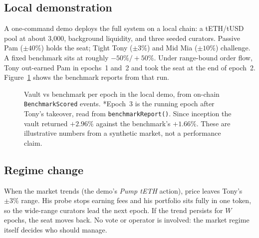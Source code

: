 \documentclass[11pt,a4paper]{article}
\newcommand{\code}[1]{\texttt{\small #1}}
\begin{document}
\subsection{Local demonstration}
A one-command demo deploys the full system on a local chain: a tETH/tUSD pool at about 3{,}000, background liquidity, and three seeded curators. Passive Pam ($\pm 40\%$) holds the seat; Tight Tony ($\pm 3\%$) and Mid Mia ($\pm 10\%$) challenge. A fixed benchmark sits at roughly $-50\%/+50\%$. Under range-bound order flow, Tony out-earned Pam in epochs~1 and~2 and took the seat at the end of epoch~2. Figure~\ref{fig:demo} shows the benchmark reports from that run.

\begin{figure}[h]
\centering
{}
\caption{Vault vs benchmark per epoch in the local demo, from on-chain \code{BenchmarkScored} events. *Epoch~3 is the running epoch after Tony's takeover, read from \code{benchmarkReport()}. Since inception the vault returned $+2.96\%$ against the benchmark's $+1.66\%$. These are illustrative numbers from a synthetic market, not a performance claim.}
\label{fig:demo}
\end{figure}

\subsection{Regime change}
When the market trends (the demo's \emph{Pump tETH} action), price leaves Tony's $\pm3\%$ range. His probe stops earning fees and his portfolio sits fully in one token, so the wide-range curators lead the next epoch. If the trend persists for $W$ epochs, the seat moves back. No vote or operator is involved: the market regime itself decides who should manage.
\end{document}

